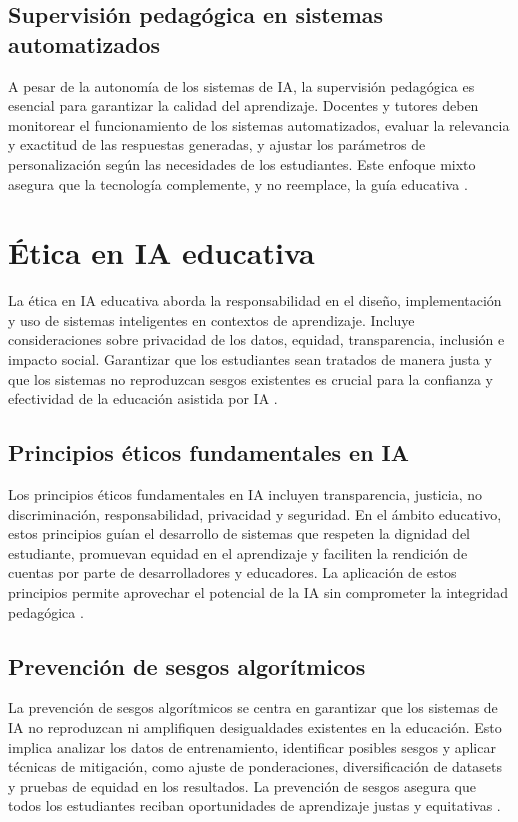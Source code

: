 \subsection{Supervisión pedagógica en sistemas automatizados}
A pesar de la autonomía de los sistemas de IA, la supervisión pedagógica es
esencial para garantizar la calidad del aprendizaje. Docentes y tutores deben
monitorear el funcionamiento de los sistemas automatizados, evaluar la
relevancia y exactitud de las respuestas generadas, y ajustar los parámetros de
personalización según las necesidades de los estudiantes. Este enfoque mixto
asegura que la tecnología complemente, y no reemplace, la guía educativa
\cite{holmes2019ai, luckin2016intelligence}.

\section{Ética en IA educativa}
La ética en IA educativa aborda la responsabilidad en el diseño, implementación
y uso de sistemas inteligentes en contextos de aprendizaje. Incluye
consideraciones sobre privacidad de los datos, equidad, transparencia,
inclusión e impacto social. Garantizar que los estudiantes sean tratados de
manera justa y que los sistemas no reproduzcan sesgos existentes es crucial
para la confianza y efectividad de la educación asistida por IA
\cite{selwyn2019should, williamson2023social}.

\subsection{Principios éticos fundamentales en IA}
Los principios éticos fundamentales en IA incluyen transparencia, justicia, no
discriminación, responsabilidad, privacidad y seguridad. En el ámbito
educativo, estos principios guían el desarrollo de sistemas que respeten la
dignidad del estudiante, promuevan equidad en el aprendizaje y faciliten la
rendición de cuentas por parte de desarrolladores y educadores. La aplicación
de estos principios permite aprovechar el potencial de la IA sin comprometer la
integridad pedagógica \cite{jobin2019global, floridi2018ai}.

\subsection{Prevención de sesgos algorítmicos}
La prevención de sesgos algorítmicos se centra en garantizar que los sistemas
de IA no reproduzcan ni amplifiquen desigualdades existentes en la educación.
Esto implica analizar los datos de entrenamiento, identificar posibles sesgos y
aplicar técnicas de mitigación, como ajuste de ponderaciones, diversificación
de datasets y pruebas de equidad en los resultados. La prevención de sesgos
asegura que todos los estudiantes reciban oportunidades de aprendizaje justas y
equitativas \cite{mehrabi2019survey, binns2018fairness}.

